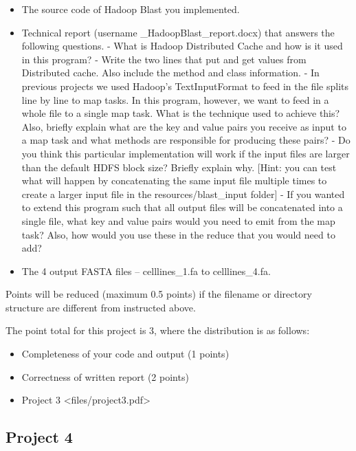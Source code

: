 \begin{itemize}
\tightlist
\item
  The source code of Hadoop Blast you implemented.
\item
  Technical report (username \_HadoopBlast\_report.docx) that answers
  the following questions. - What is Hadoop Distributed Cache and how is
  it used in this program? - Write the two lines that put and get values
  from Distributed cache. Also include the method and class information.
  - In previous projects we used Hadoop's TextInputFormat to feed in the
  file splits line by line to map tasks. In this program, however, we
  want to feed in a whole file to a single map task. What is the
  technique used to achieve this? Also, briefly explain what are the key
  and value pairs you receive as input to a map task and what methods
  are responsible for producing these pairs? - Do you think this
  particular implementation will work if the input files are larger than
  the default HDFS block size? Briefly explain why. {[}Hint: you can
  test what will happen by concatenating the same input file multiple
  times to create a larger input file in the resources/blast\_input
  folder{]} - If you wanted to extend this program such that all output
  files will be concatenated into a single file, what key and value
  pairs would you need to emit from the map task? Also, how would you
  use these in the reduce that you would need to add?
\item
  The 4 output FASTA files -- celllines\_1.fa to celllines\_4.fa.
\end{itemize}

Points will be reduced (maximum 0.5 points) if the filename or directory
structure are different from instructed above.

The point total for this project is 3, where the distribution is as
follows:

\begin{itemize}
\tightlist
\item
  Completeness of your code and output (1 points)
\item
  Correctness of written report (2 points)
\item
  Project 3 \textless{}files/project3.pdf\textgreater{}
\end{itemize}

\subsection{Project 4}\label{project-4}

